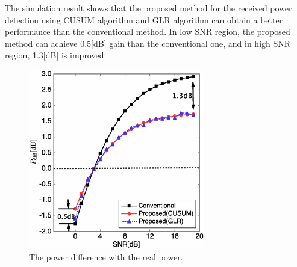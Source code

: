 The simulation result shows that the proposed method for the received power detection using CUSUM algorithm and GLR algorithm can obtain a better performance than the conventional method. In low SNR region, the proposed method can achieve 0.5[dB] gain than the conventional one, and in high SNR region, 1.3[dB] is improved.

\begin{figure}[t]
\centering
\includegraphics[width=77mm]{powdiff.eps}
\caption{The power difference with the real power.}
\label{Powdiff}
\end{figure}
